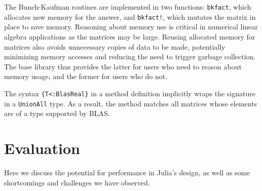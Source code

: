 \documentclass[10pt, preprint]{sigplanconf}
\begin{document}
The Bunch-Kaufman routines are implemented in two functions: \verb|bkfact|,
which allocates new memory for the answer, and \verb|bkfact!|, which mutates
the matrix in place to save memory. Reasoning about memory use is critical in
numerical linear algebra applications as the matrices may be large.
Reusing allocated memory for matrices also avoids unnecessary copies of data to
be made, potentially minimizing memory accesses and reducing the need to
trigger garbage collection. The base library thus provides the latter for users
who need to reason about memory usage, and the former for users who do not.

The syntax \verb|{T<:BlasReal}| in a method definition implicitly wraps the
signature in a \verb|UnionAll| type. As a result, the method matches all
matrices whose elements are of a type supported by BLAS.





\section{Evaluation}

Here we discuss the potential for performance in Julia's design,
as well as some shortcomings and challenges we have observed.


\end{document}
